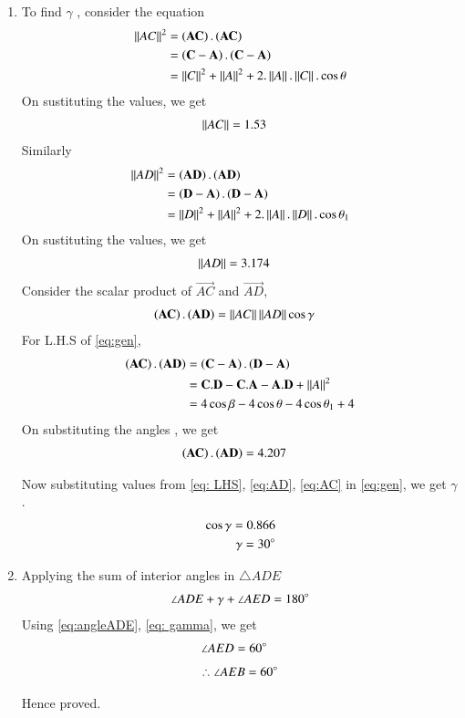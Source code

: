 \begin{enumerate}[label=\thesection.\arabic*.,ref=\thesection.\theenumi]
\item To find $\gamma$ ,
consider the equation
\begin{align}
\left\lVert AC\right\rVert^2 &= \left(\mathbf{AC}\right). \left(\mathbf{AC}\right) \\
&= \left(\mathbf{C} - \mathbf{A}\right).\left(\mathbf{C} - \mathbf{A}\right) \\
&= \left\lVert C\right\rVert^2 + \left\lVert A\right\rVert^2 + 2.\left\lVert A\right\rVert.\left\lVert C\right\rVert.\cos\theta
\end{align}
On sustituting the values, we get 
\begin{align}
\left\lVert AC\right\rVert &= 1.53
\label{eq:AC}
\end{align}
Similarly 
\begin{align}
\left\lVert AD\right\rVert^2 &= \left(\mathbf{AD}\right). \left(\mathbf{AD}\right) \\
&= \left(\mathbf{D} - \mathbf{A}\right).\left(\mathbf{D} - \mathbf{A}\right) \\
&= \left\lVert D\right\rVert^2 + \left\lVert A\right\rVert^2 + 2.\left\lVert A\right\rVert.\left\lVert D\right\rVert.\cos\theta_1
\end{align}
On sustituting the values, we get 
\begin{align}
\left\lVert AD\right\rVert &= 3.174
\label{eq:AD}
\end{align}
Consider the scalar product of $\vec{AC}$ and $\vec{AD}$,
\begin{align}
\left(\mathbf{AC}\right).\left(\mathbf{AD}\right) &= \left\lVert AC\right\rVert\left\lVert AD\right\rVert\cos\gamma
\label{eq:gen}
\end{align}
For L.H.S of \eqref{eq:gen},
\begin{align}
\left(\mathbf{AC}\right).\left(\mathbf{AD}\right) &= \left(\mathbf{C} - \mathbf{A}\right).\left(\mathbf{D} - \mathbf{A}\right)\\
 &= \mathbf{C}.\mathbf{D} - \mathbf{C}.\mathbf{A} - \mathbf{A}.\mathbf{D} + \left\lVert A\right\rVert^2 \\
 &= 4\cos\beta - 4\cos\theta - 4\cos\theta_1 + 4
\end{align}
On substituting the angles , we get
\begin{align}
\left(\mathbf{AC}\right).\left(\mathbf{AD}\right) &= 4.207
\label{eq: LHS}
\end{align}

Now substituting values from \eqref{eq: LHS}, \eqref{eq:AD}, \eqref{eq:AC} in \eqref{eq:gen}, we get $\gamma$.
\begin{align}
\cos\gamma = 0.866 \\
\gamma= 30\degree
\label{eq: gamma}
\end{align}



    
\item Applying the sum of interior angles in $\triangle ADE$ 
\begin{align}
\angle ADE + \gamma + \angle AED = 180\degree
\label{eq:eq_6}
\end{align}
Using \eqref{eq:angleADE}, \eqref{eq: gamma}, we get
\begin{align}
\angle AED &= 60\degree
\end{align}
\begin{align}
\therefore \angle AEB = 60\degree 
\end{align}
    
Hence proved.
    
\end{enumerate}   
       